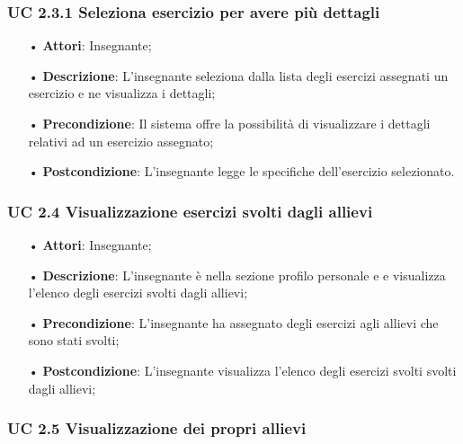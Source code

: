 \subsubsection{UC 2.3.1 Seleziona esercizio per avere più dettagli}
\begin{itemize}
	\item[•] \textbf{Attori}: Insegnante;
	\item[•] \textbf{Descrizione}:  L’insegnante seleziona dalla lista degli esercizi assegnati un esercizio e ne visualizza i dettagli;
	\item[•] \textbf{Precondizione}: Il sistema offre la possibilità di visualizzare i dettagli relativi ad un esercizio assegnato;
	\item[•] \textbf{Postcondizione}: L’insegnante legge le specifiche dell’esercizio selezionato.
\end{itemize}



\subsubsection{UC 2.4 Visualizzazione esercizi svolti dagli allievi}
\begin{itemize}
	\item[•] \textbf{Attori}: Insegnante;
	\item[•] \textbf{Descrizione}:  L’insegnante è nella sezione profilo personale e e visualizza l’elenco degli esercizi svolti dagli allievi;
	\item[•] \textbf{Precondizione}:  L’insegnante ha assegnato degli esercizi agli allievi che sono stati svolti;

	\item[•] \textbf{Postcondizione}: L’insegnante visualizza l'elenco degli esercizi svolti svolti dagli allievi; 	
\end{itemize}

\subsubsection{UC 2.5 Visualizzazione dei propri allievi}



